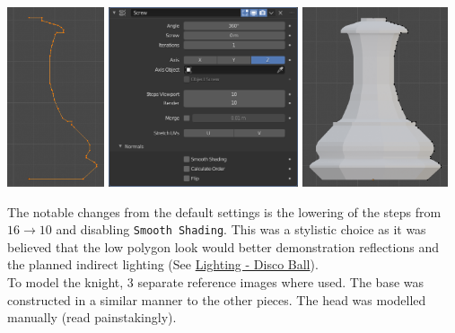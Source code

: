 \documentclass[11pt]{article}
\begin{document}
\begin{center}
\includegraphics[height=150pt]{Images/modelling piece inprogress.png}
\includegraphics[height=150pt]{Images/screw settings.png}
\includegraphics[height=150pt]{Images/pawn model.png}
\end{center}
The notable changes from the default settings is the lowering of the steps from
\(16 \to 10\) and disabling \texttt{Smooth Shading}. This was a stylistic choice as it
was believed that the low polygon look would better demonstration reflections and
the planned indirect lighting (See \hyperref[sec:orga93bd61]{Lighting - Disco Ball}).\\

To model the knight, 3 separate reference images where used. The base was
constructed in a similar manner to the other pieces. The head was modelled
manually (read painstakingly).
\end{document}

